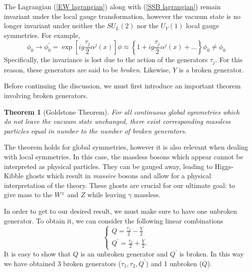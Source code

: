 \documentclass[10pt,a4paper]{book}
\newtheorem{theorem}{Theorem}[section]
\begin{document}
The Lagrangian (\ref{EW lagrangian}) along with (\ref{SSB lagrangian}) remain invariant under the local gauge transformation, however the vacuum state is no longer invariant under neither the $SU_L(2)$ nor the $U_Y(1)$ local gauge symmetries. For example, 
\begin{equation}
\phi_0 \rightarrow \phi_0^\prime = \exp\left[ig \frac{\tau_j}{2}\alpha^j(x)\right]\phi \approx \left\lbrace 1  + ig\frac{\tau_j}{2}\alpha^j(x) + \dots \right\rbrace\phi_0 \neq \phi_0
\end{equation}
Specifically, the invariance is lost due to the action of the generators $\tau_j$. For this reason, these generators are said to be \emph{broken}. Likewise, $Y$ is a broken generator.

Before continuing the discussion, we must first introduce an important theorem involving broken generators.

\begin{theorem}[Goldstone Theorem]
\label{Goldstone Theorem}
For all continuous global symmetries which do not leave the vacuum state unchanged, there exist corresponding massless particles equal in number to the number of broken generators.
\end{theorem}

The theorem holds for global symmetries, however it is also relevant when dealing with local symmetries. In this case, the massless bosons which appear cannot be interpreted as physical particles. They can be gauged away, leading to Higgs-Kibble ghosts which result in \emph{massive} bosons and allow for a physical interpretation of the theory. These ghosts are crucial for our ultimate goal: to give mass to the $W^\pm$ and $Z$ while leaving $\gamma$ massless.

In order to get to our desired result, we must make sure to have one unbroken generator. To obtain it, we can consider the following linear combinations
\begin{equation}
\begin{cases}
Q = \frac{\tau_3}{2} - \frac{Y}{2} \\
Q^\prime = \frac{\tau_3}{2} + \frac{Y}{2}.
\end{cases}
\end{equation}
It is easy to show that $Q$ is an unbroken generator and $Q^\prime$ is broken. In this way we have obtained 3 broken generators ($\tau_1, \tau_2, Q^\prime$) and 1 unbroken ($Q$).
\end{document}
